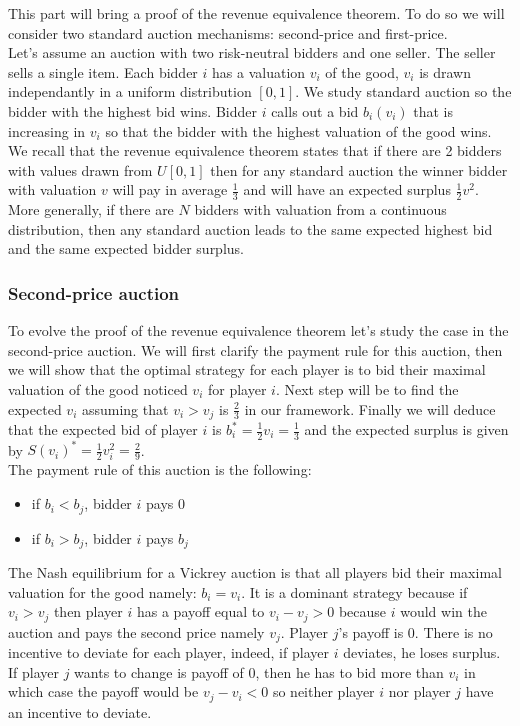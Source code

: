 \documentclass[12pt]{article}
\begin{document}
This part will bring a proof of the revenue equivalence theorem. To do so we will consider two standard auction mechanisms: second-price and first-price.\\
Let's assume an auction with two risk-neutral bidders and one seller. The seller sells a single item. Each bidder $i$ has a valuation $v_i$ of the good, $v_i$ is drawn independantly in a uniform distribution $[0,1]$. We study standard auction so the bidder with the highest bid wins. Bidder $i$ calls out a bid $b_i(v_i)$ that is increasing in $v_i$ so that the bidder with the highest valuation of the good wins. We recall that the revenue equivalence theorem states that if there are 2 bidders with values drawn from $U[0,1]$ then for any standard auction the winner bidder with valuation $v$ will pay in average $\frac{1}{3}$ and will have an expected surplus $\frac{1}{2}v^2$. More generally, if there are $N$ bidders with valuation from a continuous distribution, then any standard auction leads to the same expected highest bid and the same expected bidder surplus. 

\subsubsection{Second-price auction}
To evolve the proof of the revenue equivalence theorem let's study the case in the second-price auction. We will first clarify the payment rule for this auction, then we will show that the optimal strategy for each player is to bid their maximal valuation of the good noticed $v_i$ for player $i$. Next step will be to find the expected $v_i$ assuming that $v_i > v_j$ is $\frac{2}{3}$ in our framework. Finally we will deduce that the expected bid of player $i$ is $b_i^* = \frac{1}{2}v_i = \frac{1}{3}$ and the expected surplus is given by $S(v_i)^* = \frac{1}{2}v_i^2 = \frac{2}{9}$.\\

\noindent The payment rule of this auction is the following: 
\begin{itemize}
	\item if $b_i < b_j$, bidder $i$ pays $0$
	\item if $b_i > b_j$, bidder $i$ pays $b_j$
\end{itemize}
The Nash equilibrium for a Vickrey auction is that all players bid their maximal valuation for the good namely: $b_i = v_i$. It is a dominant strategy because if $v_i > v_j$ then player $i$ has a payoff equal to $v_i - v_j > 0$ because $i$ would win the auction and pays the second price namely $v_j$. Player $j$'s payoff is 0. There is no incentive to deviate for each player, indeed, if player $i$ deviates, he loses surplus. If player $j$ wants to change is payoff of 0, then he has to bid more than $v_i$ in which case the payoff would be $v_j - v_i < 0$ so neither player $i$ nor player $j$ have an incentive to deviate.\\
\end{document}
